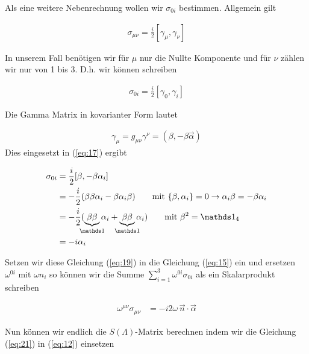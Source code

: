 Als eine weitere Nebenrechnung wollen wir \(\sigma_{0i}\) bestimmen. Allgemein gilt

\begin{align}
  \label{eq:16}
  \sigma_{\mu\nu}=\frac{i}{2}[\gamma_\mu,\gamma_\nu] 
\end{align}

In unserem Fall benötigen wir für \(\mu\) nur die Nullte Komponente und für \(\nu\) zählen wir nur von 1 bis 3. D.h. wir können schreiben

\begin{align}
  \label{eq:17}
  \sigma_{0i}= \frac{i}{2}[\gamma_0,\gamma_i]
\end{align}

Die Gamma Matrix in kovarianter Form lautet

\begin{align}
  \label{eq:18}
  \gamma_\mu = g_{\mu\nu}\gamma^{\nu} = (\beta,-\beta\vec \alpha)
\end{align}
Dies eingesetzt in (\ref{eq:17}) ergibt

\begin{align}
  \label{eq:19}
   \sigma_{0i} &= \frac{i}{2}[\beta,-\beta\alpha_i] \notag\\
&= -\frac{i}{2} ( \beta\beta\alpha_i -\beta\alpha_i\beta  ) \qquad \text{mit }\{\beta,\alpha_i\}=0\rightarrow \alpha_i\beta=-\beta\alpha_i  \notag\\
&= -\frac{i}{2} ( \underbr{\beta\beta}_{\mathds 1}\alpha_i + \underbr{\beta\beta}_{\mathds 1}\alpha_i) \qquad \text{mit }\beta^2 = \mathds 1_4 \notag\\
&= - i \alpha_i
\end{align}

Setzen wir diese Gleichung (\ref{eq:19}) in die Gleichung (\ref{eq:15}) ein und ersetzen \(\omega^{0i}\) mit \(\omega n_i\) so können wir die Summe \(\sum_{i=1}^3 \omega^{0i}\sigma_{0i}\) als ein Skalarprodukt schreiben

\begin{align}
  \label{eq:21}
  \omega^{\mu\nu}\sigma_{\mu\nu} &= -i2\omega\,\vec n\cdot\vec \alpha
\end{align}

Nun können wir endlich die \(S(\Lambda)\)-Matrix berechnen indem wir die Gleichung (\ref{eq:21}) in (\ref{eq:12}) einsetzen

